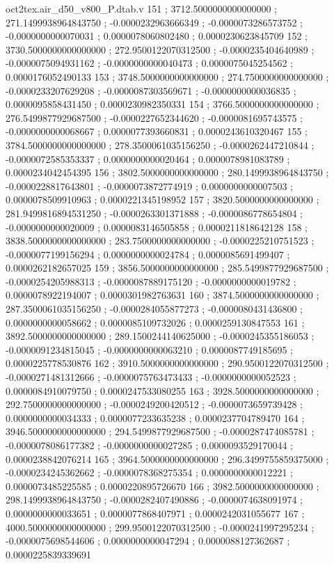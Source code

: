 \begin{filecontents}[overwrite]{oct2tex.air_d50_v800_P.dtab.v}
151 ; 3712.5000000000000000 ; 271.1499938964843750 ; -0.0000232963666349 ; -0.0000073286573752 ; -0.0000000000070031 ; 0.0000078060802480 ; 0.0000230623845709
152 ; 3730.5000000000000000 ; 272.9500122070312500 ; -0.0000235404640989 ; -0.0000075094931162 ; -0.0000000000040473 ; 0.0000075045254562 ; 0.0000176052490133
153 ; 3748.5000000000000000 ; 274.7500000000000000 ; -0.0000233207629208 ; -0.0000087303569671 ; -0.0000000000036835 ; 0.0000095858431450 ; 0.0000230982350331
154 ; 3766.5000000000000000 ; 276.5499877929687500 ; -0.0000227652344620 ; -0.0000081695743575 ; -0.0000000000068667 ; 0.0000077393660831 ; 0.0000243610320467
155 ; 3784.5000000000000000 ; 278.3500061035156250 ; -0.0000262447210844 ; -0.0000072585353337 ; 0.0000000000020464 ; 0.0000078981083789 ; 0.0000234042454395
156 ; 3802.5000000000000000 ; 280.1499938964843750 ; -0.0000228817643801 ; -0.0000073872774919 ; 0.0000000000007503 ; 0.0000078509910963 ; 0.0000221345198952
157 ; 3820.5000000000000000 ; 281.9499816894531250 ; -0.0000263301371888 ; -0.0000086778654804 ; -0.0000000000020009 ; 0.0000083146505858 ; 0.0000211818642128
158 ; 3838.5000000000000000 ; 283.7500000000000000 ; -0.0000225210751523 ; -0.0000077199156294 ; 0.0000000000024784 ; 0.0000085691499407 ; 0.0000262182657025
159 ; 3856.5000000000000000 ; 285.5499877929687500 ; -0.0000254205988313 ; -0.0000087889175120 ; -0.0000000000019782 ; 0.0000078922194007 ; 0.0000301982763631
160 ; 3874.5000000000000000 ; 287.3500061035156250 ; -0.0000284055877273 ; -0.0000080431436800 ; 0.0000000000058662 ; 0.0000085109732026 ; 0.0000259130847553
161 ; 3892.5000000000000000 ; 289.1500244140625000 ; -0.0000245355186053 ; -0.0000091234815045 ; -0.0000000000063210 ; 0.0000087749185695 ; 0.0000225778530876
162 ; 3910.5000000000000000 ; 290.9500122070312500 ; -0.0000271481312666 ; -0.0000075763473433 ; -0.0000000000052523 ; 0.0000084910079750 ; 0.0000247533080255
163 ; 3928.5000000000000000 ; 292.7500000000000000 ; -0.0000249200420512 ; -0.0000073659739428 ; 0.0000000000034333 ; 0.0000077233635238 ; 0.0000237704789470
164 ; 3946.5000000000000000 ; 294.5499877929687500 ; -0.0000287474085781 ; -0.0000078086177382 ; -0.0000000000027285 ; 0.0000093529170044 ; 0.0000238842076214
165 ; 3964.5000000000000000 ; 296.3499755859375000 ; -0.0000234245362662 ; -0.0000078368275354 ; 0.0000000000012221 ; 0.0000073485225585 ; 0.0000220895726670
166 ; 3982.5000000000000000 ; 298.1499938964843750 ; -0.0000282407490886 ; -0.0000074638091974 ; 0.0000000000033651 ; 0.0000077868407971 ; 0.0000242031055677
167 ; 4000.5000000000000000 ; 299.9500122070312500 ; -0.0000241997295234 ; -0.0000075698544606 ; 0.0000000000047294 ; 0.0000088127362687 ; 0.0000225839339691

\end{filecontents}
